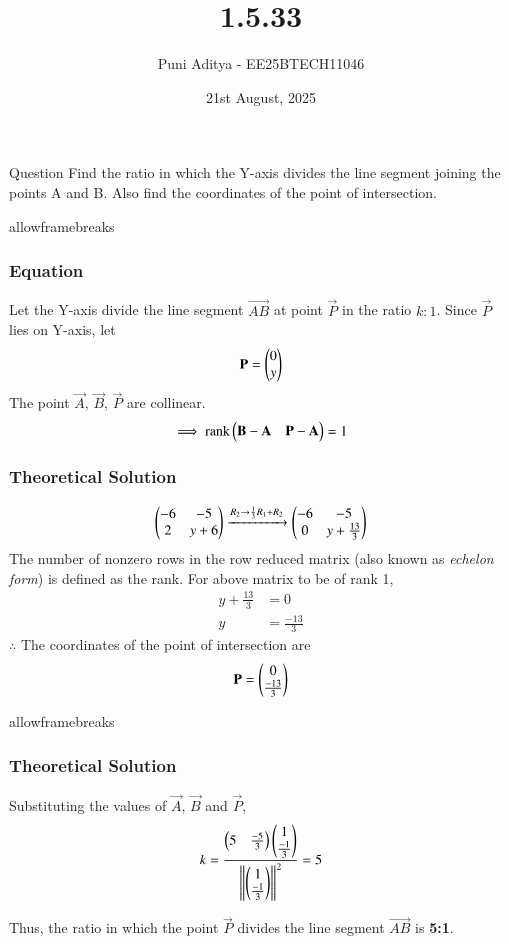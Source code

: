 \documentclass{beamer}
\title{1.5.33}
\date{21st August, 2025}
\author{Puni Aditya - EE25BTECH11046}
\begin{document}
\frame{\titlepage}
\begin{frame}{Question}
Find the ratio in which the Y-axis divides the line segment joining the points A and B. Also find the coordinates of the point of intersection.
\end{frame}

\begin{frame}{allowframebreaks}
\frametitle{Equation}
Let the Y-axis divide the line segment $\vec{AB}$ at point $\vec{P}$ in the ratio $k:1$.
Since $\vec{P}$ lies on Y-axis, let
\begin{align*}
\vec{P} = \myvec{0 \\ y}
\end{align*}
The point $\vec{A}$, $\vec{B}$, $\vec{P}$ are collinear.
\begin{align}
\implies \text{rank}\myvec{\vec{B}-\vec{A} & \vec{P}-\vec{A}} = 1
\end{align}
\end{frame}

\begin{frame}[fragile]
	\frametitle{Theoretical Solution}
\begin{align}
	\myvec{-6 & -5 \\ 2 & y+6} \xleftrightarrow[]{R_2 \rightarrow {\frac{1}{3}R_1 + R_2}} \myvec{-6 & -5 \\ 0 & y+\frac{13}{3}}  
\end{align}
The number of nonzero rows in the row reduced matrix (also known as {\em echelon form}) is defined as the rank. For above matrix to be of rank 1,
\begin{align}
y+\frac{13}{3} &= 0 \\
y &= \frac{-13}{3}
\end{align}
$\therefore$ The coordinates of the point of intersection are 
\begin{align*}
\vec{P} = \myvec{0 \\ \frac{-13}{3}}
\end{align*}
\end{frame}

\begin{frame}{allowframebreaks}
\frametitle{Theoretical Solution}
Substituting the values of $\vec{A}$, $\vec{B}$ and $\vec{P}$,
\begin{align}
k=\frac{\myvec{5 & \frac{-5}{3}}\myvec{1 \\ \frac{-1}{3}}}{\norm{\myvec{1 \\ \frac{-1}{3}}}^2}=5
\end{align}

Thus, the ratio in which the point $\vec{P}$ divides the line segment $\vec{AB}$ is \textbf{5:1}.
\end{frame}
\end{document}
